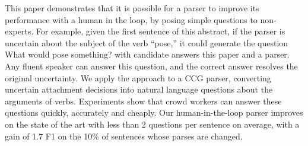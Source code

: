 This paper demonstrates that it is possible for a parser to improve its performance with a human in the loop, by posing simple questions to non-experts. For example, given the first sentence of this abstract, if the parser is uncertain about the subject of the verb ``pose,'' it could generate the question What would pose something? with candidate answers this paper and a parser. Any fluent speaker can answer this question, and the correct answer resolves the original uncertainty. We apply the approach to a CCG parser, converting uncertain attachment decisions into natural language questions about the arguments of verbs. Experiments show that crowd workers can answer these questions quickly, accurately and cheaply. Our human-in-the-loop parser improves on the state of the art with less than 2 questions per sentence on average, with a gain of 1.7 F1 on the 10\% of sentences whose parses are changed.
